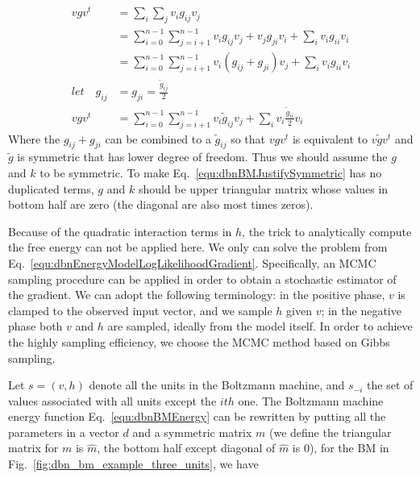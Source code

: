 \documentclass[runningheads,openany]{xhlPaper}
\begin{document}
\begin{equation}
\label{equ:dbnBMJustifySymmetric}
\begin{aligned}
vg{v^t} &= \sum\limits_i {\sum\limits_j {{v_i}{g_{ij}}{v_j}} } \\
 &= \sum\limits_{i = 0}^{n - 1} {\sum\limits_{j = i + 1}^{n - 1} {{v_i}{g_{ij}}{v_j} + {v_j}{g_{ji}}{v_i}} }  + \sum\limits_i {{v_i}{g_{ii}}{v_i}} \\
 &= \sum\limits_{i = 0}^{n - 1} {\sum\limits_{j = i + 1}^{n - 1} {{v_i}\left( {{g_{ij}} + {g_{ji}}} \right){v_j}} }  + \sum\limits_i {{v_i}{g_{ii}}{v_i}} \\
let\quad {g_{ij}} &= {g_{ji}} = \frac{{{{\tilde g}_{ij}}}}{2}\\
vg{v^t} &= \sum\limits_{i = 0}^{n - 1} {\sum\limits_{j = i + 1}^{n - 1} {{v_i}{{\tilde g}_{ij}}{v_j}} }  + \sum\limits_i {{v_i}\frac{{{{\tilde g}_{ii}}}}{2}{v_i}} 
\end{aligned}
\end{equation}
Where the ${g_{ij}} + {g_{ji}}$ can be combined to a ${{\tilde g}_{ij}}$ so that $vg{v^t}$ is equivalent to $v\tilde g{v^t}$ and $\tilde{g}$ is symmetric that has lower degree of freedom. Thus we should assume the $g$ and $k$ to be symmetric.
To make Eq.~\ref{equ:dbnBMJustifySymmetric} has no duplicated terms, $g$ and $k$ should be 
upper triangular matrix whose values in bottom half are zero (the diagonal are also most times zeros).

Because of the quadratic interaction terms in $h$, the trick to analytically compute the free energy can not be applied here. We only can solve the problem from Eq.~\ref{equ:dbnEnergyModelLogLikelihoodGradient}.
Specifically, an MCMC sampling procedure can be applied in order to obtain a stochastic estimator of the gradient. We can adopt the following terminology: in the positive phase, $v$ is clamped to the observed input vector, and we sample $h$ given $v$; in the negative phase both $v$ and $h$ are sampled, ideally from the model itself. In order to achieve the highly sampling efficiency, we choose the MCMC method based on Gibbs sampling.

Let $s = \left(v, h\right)$ denote all the units in the Boltzmann machine, and $s_{-i}$ the set of values associated with all units except the $ith$ one.
The Boltzmann machine energy function Eq.~\ref{equ:dbnBMEnergy} can be rewritten by putting all the parameters in a vector $d$ and a symmetric matrix $m$ (we define the triangular matrix for $m$ is $\hat{m}$, the bottom half except diagonal of $\hat m$ is $0$), for the BM in Fig.~\ref{fig:dbn_bm_example_three_units}, we have
\end{document}
